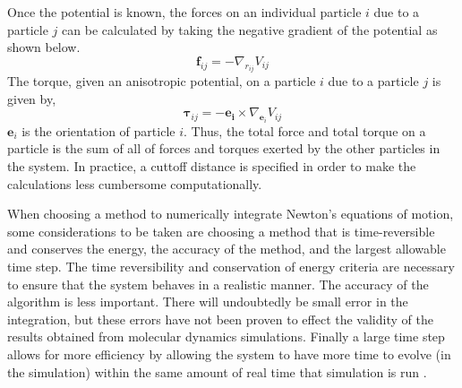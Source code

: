 \documentclass[preprint, aps]{revtex4-1}
\begin{document}
Once the potential is known, the forces on an individual particle $i$ due to a 
particle $j$ can be calculated by taking the negative gradient of the potential 
as shown below.
	\begin{equation} \label{force}
		\mathbf{f}_{ij}=-\nabla_{r_{ij}}V_{ij}
	\end{equation}
The torque, given an anisotropic potential, on a particle $i$ due to a particle 
$j$ is given by,
	\begin{equation} \label{torque}
		\mathbf{\tau}_{ij}=-\mathbf{e_i}\times\nabla_{\mathbf{e}_{i}}V_{ij}
	\end{equation}
$\mathbf{e}_{i}$ is the orientation of particle $i$. Thus, the total force and 
total torque on a particle is the sum of all of forces and torques exerted by 
the other particles in the system. In practice, a cuttoff distance is specified 
in order to make the calculations less cumbersome computationally.
	
When choosing a method to numerically integrate Newton's equations of motion, 
some considerations to be taken are choosing a method that is time-reversible 
and conserves the energy, the accuracy of the method, and the largest allowable 
time step. The time reversibility and conservation of energy criteria are 
necessary to ensure that the system behaves in a realistic manner. The accuracy 
of the algorithm is less important. There will undoubtedly be small error in the 
integration, but these errors have not been proven to effect the validity of the 
results obtained from molecular dynamics simulations. Finally a large time step
allows for more efficiency by allowing the system to have more time to evolve 
(in the simulation) within the same amount of real time that simulation is run
\cite{frenkel01}.
\end{document}
